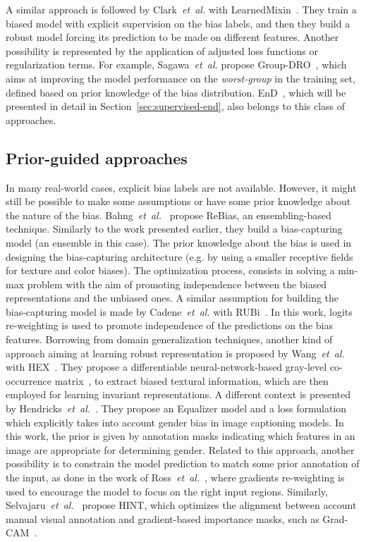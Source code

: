 A similar approach is followed by Clark~\emph{et~al.} with LearnedMixin~\cite{ClarkYZ19}. They train a biased model with explicit supervision on the bias labels, and then they build a robust model forcing its prediction to be made on different features.
Another possibility is represented by the application of adjusted loss functions or regularization terms.
For example, Sagawa~\emph{et~al.} propose Group-DRO~\cite{sagawa2019distributionally}, which aims at improving the model performance on the \emph{worst-group} in the training set, defined based on prior knowledge of the bias distribution.
EnD~\cite{tartaglione2021end}, which will be presented in detail in Section~\ref{sec:supervised-end}, also belongs to this class of approaches. 

\subsection{Prior-guided approaches}
In many real-world cases, explicit bias labels are not available. However, it might still be possible to make some assumptions or have some prior knowledge about the nature of the bias.
Bahng~\emph{et~al.}~\cite{bahng2019rebias} propose ReBias, an ensembling-based technique. Similarly to the work presented earlier, they build a bias-capturing model (an ensemble in this case). The prior knowledge about the bias is used in designing the bias-capturing architecture (e.g. by using a smaller receptive fields for texture and color biases). The optimization process, consists in solving a min-max problem with the aim of promoting independence between the biased representations and the unbiased ones.
A similar assumption for building the bias-capturing model is made by Cadene~\emph{et~al.} with RUBi~\cite{cadene2019rubi}. In this work, logits re-weighting is used to promote independence of the predictions on the bias features.
Borrowing from domain generalization techniques, another kind of approach aiming at learning robust representation is proposed by  Wang~\emph{et~al.} with HEX~\cite{wang2018learning}. They propose a differentiable neural-network-based gray-level co-occurrence matrix~\cite{haralick1973textural, lam1996glcm}, to extract biased textural information, which are then employed for learning invariant representations.
A different context is presented by Hendricks~\emph{et~al.}~\cite{hendricks2018women}. They propose an Equalizer model and a loss formulation which explicitly takes into account gender bias in image captioning models. In this work, the prior is given by annotation masks indicating which features in an image are appropriate for determining gender.
Related to this approach, another possibility is to constrain the model prediction to match some prior annotation of the input, as done in the work of Ross~\emph{et~al.}~\cite{Ross2017RightFT}, where gradients re-weighting is used to encourage the model to focus on the right input regions. Similarly, Selvajaru~\emph{et~al.}~\cite{Selvaraju_2019_ICCV} propose HINT, which optimizes the alignment between account manual visual annotation and gradient-based importance masks, such as Grad-CAM~\cite{selvaraju2017grad}.

